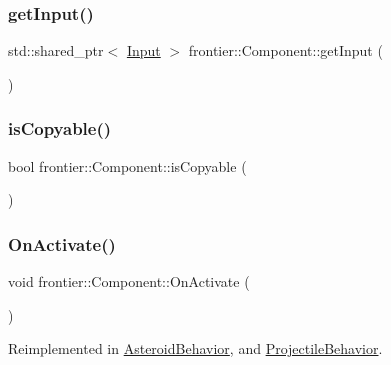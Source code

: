 \subsubsection{\texorpdfstring{get\+Input()}{getInput()}}
{\footnotesize\ttfamily std\+::shared\+\_\+ptr$<$ \hyperlink{classfrontier_1_1_input}{Input} $>$ frontier\+::\+Component\+::get\+Input (\begin{DoxyParamCaption}{ }\end{DoxyParamCaption})\hspace{0.3cm}{\ttfamily [protected]}}

\mbox{\label{classfrontier_1_1_component_a1a32971a12ec277a519b30ba056c9d89}} 
\subsubsection{\texorpdfstring{is\+Copyable()}{isCopyable()}}
{\footnotesize\ttfamily bool frontier\+::\+Component\+::is\+Copyable (\begin{DoxyParamCaption}{ }\end{DoxyParamCaption})}

\mbox{\label{classfrontier_1_1_component_a77fca7ba1960aafb9bc05905e300c79d}} 
\subsubsection{\texorpdfstring{On\+Activate()}{OnActivate()}}
{\footnotesize\ttfamily void frontier\+::\+Component\+::\+On\+Activate (\begin{DoxyParamCaption}{ }\end{DoxyParamCaption})\hspace{0.3cm}{\ttfamily [virtual]}}



Reimplemented in \hyperlink{class_asteroid_behavior_a7c4f344a9461d1296d4dcfcd51ed3bbc}{Asteroid\+Behavior}, and \hyperlink{class_projectile_behavior_aa01c813e541f6069d7ca9c69848ca0a6}{Projectile\+Behavior}.

\mbox{\label{classfrontier_1_1_component_a8faf337be5ba5fa3ca65c4be79d904c4}} 
